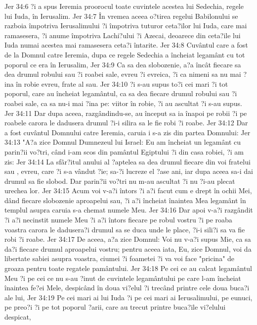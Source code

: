 Jer 34:6  ?i a spus Ieremia proorocul toate cuvintele acestea lui Sedechia, regele lui Iuda, în Ierusalim.
Jer 34:7  În vremea aceea o?tirea regelui Babilonului se razboia împotriva Ierusalimului ?i împotriva tuturor ceta?ilor lui Iuda, care mai ramasesera, ?i anume împotriva Lachi?ului ?i Azecai, deoarece din ceta?ile lui Iuda numai acestea mai ramasesera ceta?i întarite.
Jer 34:8  Cuvântul care a fost de la Domnul catre Ieremia, dupa ce regele Sedechia a încheiat legamânt cu tot poporul ce era în Ierusalim,
Jer 34:9  Ca sa dea slobozenie, a?a încât fiecare sa dea drumul robului sau ?i roabei sale, evreu ?i evreica, ?i ca nimeni sa nu mai ?ina în robie evreu, frate al sau.
Jer 34:10  ?i s-au supus to?i cei mari ?i tot poporul, care au încheiat legamântul, ca sa dea fiecare drumul robului sau ?i roabei sale, ca sa nu-i mai ?ina pe: viitor în robie, ?i au ascultat ?i s-au supus.
Jer 34:11  Dar dupa aceea, razgândindu-se, au început sa ia înapoi pe robii ?i pe roabele carora le dadusera drumul ?i-i silira sa le fie robi ?i roabe.
Jer 34:12  Dar a fost cuvântul Domnului catre Ieremia, caruia i s-a zis din partea Domnului:
Jer 34:13  "A?a zice Domnul Dumnezeul lui Israel: Eu am încheiat un legamânt cu parin?ii vo?tri, când i-am scos din pamântul Egiptului ?i din casa robiei, ?i am zis:
Jer 34:14  La sfâr?itul anului al ?aptelea sa dea drumul fiecare din voi fratelui sau , evreu, care ?i s-a vândut ?ie; sa-?i lucreze el ?ase ani, iar dupa aceea sa-i dai drumul sa fie slobod. Dar parin?ii vo?tri nu m-au ascultat ?i nu ?i-au plecat urechea lor.
Jer 34:15  Acum voi v-a?i întors ?i a?i facut cum e drept în ochii Mei, dând fiecare slobozenie aproapelui sau, ?i a?i încheiat înaintea Mea legamânt în templul asupra caruia s-a chemat numele Meu.
Jer 34:16  Dar apoi v-a?i razgândit ?i a?i necinstit numele Meu ?i a?i întors fiecare pe robul vostru ?i pe roaba voastra carora le dadusera?i drumul sa se duca unde le place, ?i-i sili?i sa va fie robi ?i roabe.
Jer 34:17  De aceea, a?a zice Domnul: Voi nu v-a?i supus Mie, ca sa da?i fiecare drumul aproapelui vostru; pentru aceea iata, Eu, zice Domnul, voi da libertate sabiei asupra voastra, ciumei ?i foametei ?i va voi face "pricina" de groaza pentru toate regatele pamântului.
Jer 34:18  Pe cei ce au calcat legamântul Meu ?i pe cei ce nu s-au ?inut de cuvintele legamântului pe care l-am încheiat înaintea fe?ei Mele, despicând în doua vi?elul ?i trecând printre cele doua buca?i ale lui,
Jer 34:19  Pe cei mari ai lui Iuda ?i pe cei mari ai Ierusalimului, pe eunuci, pe preo?i ?i pe tot poporul ?arii, care au trecut printre buca?ile vi?elului despicat,
